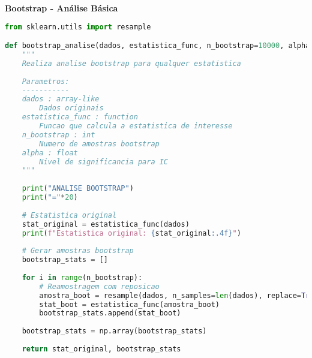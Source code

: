 \begin{researchbox}
\textbf{Bootstrap - Análise Básica}

\begin{lstlisting}[language=Python]
from sklearn.utils import resample

def bootstrap_analise(dados, estatistica_func, n_bootstrap=10000, alpha=0.05):
    """
    Realiza analise bootstrap para qualquer estatistica
    
    Parametros:
    -----------
    dados : array-like
        Dados originais
    estatistica_func : function
        Funcao que calcula a estatistica de interesse
    n_bootstrap : int
        Numero de amostras bootstrap
    alpha : float
        Nivel de significancia para IC
    """
    
    print("ANALISE BOOTSTRAP")
    print("="*20)
    
    # Estatistica original
    stat_original = estatistica_func(dados)
    print(f"Estatistica original: {stat_original:.4f}")
    
    # Gerar amostras bootstrap
    bootstrap_stats = []
    
    for i in range(n_bootstrap):
        # Reamostragem com reposicao
        amostra_boot = resample(dados, n_samples=len(dados), replace=True)
        stat_boot = estatistica_func(amostra_boot)
        bootstrap_stats.append(stat_boot)
    
    bootstrap_stats = np.array(bootstrap_stats)
    
    return stat_original, bootstrap_stats
\end{lstlisting}
\end{researchbox}

